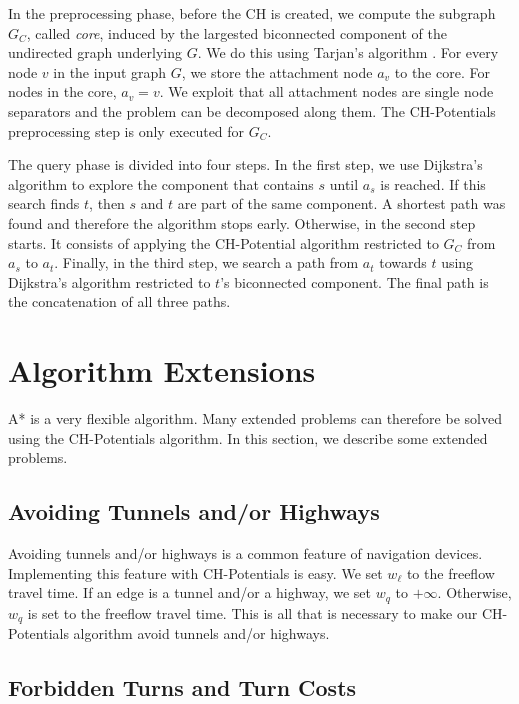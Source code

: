\documentclass[letterpaper]{article} %
\begin{document}
In the preprocessing phase, before the CH is created, we compute the subgraph $G_C$, called \emph{core}, induced by the largested biconnected component of the undirected graph underlying $G$.
We do this using Tarjan's algorithm \cite{t-dfslg2-72}.
For every node $v$ in the input graph $G$, we store the attachment node $a_v$ to the core.
For nodes in the core, $a_v=v$.
We exploit that all attachment nodes are single node separators and the problem can be decomposed along them.
The CH-Potentials preprocessing step is only executed for $G_C$.

The query phase is divided into four steps.
In the first step, we use Dijkstra's algorithm to explore the component that contains $s$ until $a_s$ is reached.
If this search finds $t$, then $s$ and $t$ are part of the same component.
A shortest path was found and therefore the algorithm stops early.
Otherwise, in the second step starts.
It consists of applying the CH-Potential algorithm restricted to $G_C$ from $a_s$ to $a_t$.
Finally, in the third step, we search a path from $a_t$ towards $t$ using Dijkstra's algorithm restricted to $t$'s biconnected component.
The final path is the concatenation of all three paths.

\section{Algorithm Extensions}
\label{sec:extensions}

A* is a very flexible algorithm.
Many extended problems can therefore be solved using the CH-Potentials algorithm.
In this section, we describe some extended problems.

\subsection{Avoiding Tunnels and/or Highways}
\label{sec:no-tunnel-highway}

Avoiding tunnels and/or highways is a common feature of navigation devices.
Implementing this feature with CH-Potentials is easy.
We set $w_\ell$ to the freeflow travel time.
If an edge is a tunnel and/or a highway, we set $w_q$ to $+\infty$.
Otherwise, $w_q$ is set to the freeflow travel time.
This is all that is necessary to make our CH-Potentials algorithm avoid tunnels and/or highways.

\subsection{Forbidden Turns and Turn Costs}
\label{sec:no-turns}
\end{document}
